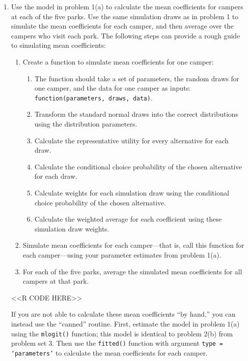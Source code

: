 \documentclass[11pt,letterpaper]{article}
\begin{document}
\begin{enumerate}[label=\alph*., leftmargin=*]
	\item Use the model in problem 1(a) to calculate the mean coefficients for campers at each of the five parks. Use the same simulation draws as in problem 1 to simulate the mean coefficients for each camper, and then average over the campers who visit each park. The following steps can provide a rough guide to simulating mean coefficients:
	\begin{enumerate}[label=\Roman*.]
		\item Create a function to simulate mean coefficients for one camper:
		\begin{enumerate}[label=\roman*.]
			\item The function should take a set of parameters, the random draws for one camper, and the data for one camper as inputs: \texttt{function(parameters, draws, data)}.
			\item Transform the standard normal draws into the correct distributions using the distribution parameters.
			\item Calculate the representative utility for every alternative for each draw.
			\item Calculate the conditional choice probability of the chosen alternative for each draw.
			\item Calculate weights for each simulation draw using the conditional choice probability of the chosen alternative.
			\item Calculate the weighted average for each coefficient using these simulation draw weights.
		\end{enumerate}
		\item Simulate mean coefficients for each camper---that is, call this function for each camper---using your parameter estimates from problem 1(a).
		\item For each of the five parks, average the simulated mean coefficients for all campers at that park.
	\end{enumerate}

	<<R CODE HERE>>

	If you are not able to calculate these mean coefficients ``by hand,'' you can instead use the ``canned'' routine. First, estimate the model in problem 1(a) using the \texttt{mlogit()} function; this model is identical to problem 2(b) from problem set 3. Then use the \texttt{fitted()} function with argument \texttt{type = `parameters'} to calculate the mean coefficients for each camper.


\end{enumerate}
\end{document}
